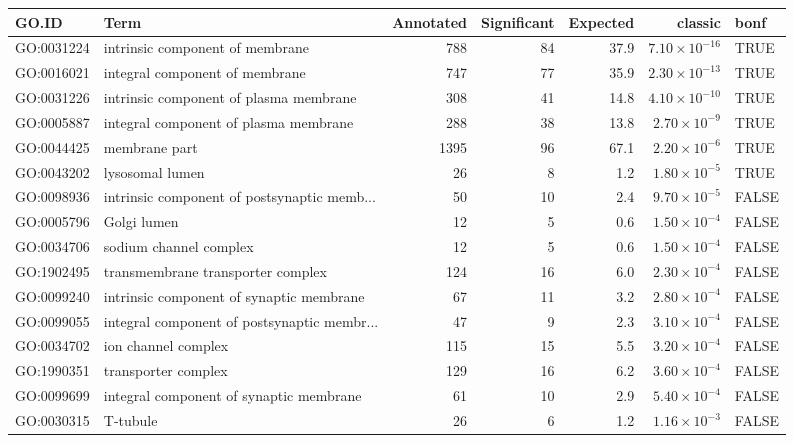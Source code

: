 \begin{table}[ht]
\centering
\begin{adjustbox}{max width=\textwidth}
\begin{tabular}{llrrrrl}
  \hline
GO.ID & Term & Annotated & Significant & Expected & classic & bonf \\ 
  \hline
GO:0031224 & intrinsic component of membrane & 788 & 84 & 37.9 & $7.10 \times 10^{-16}$ & TRUE \\ 
  GO:0016021 & integral component of membrane & 747 & 77 & 35.9 & $2.30 \times 10^{-13}$ & TRUE \\ 
  GO:0031226 & intrinsic component of plasma membrane & 308 & 41 & 14.8 & $4.10 \times 10^{-10}$ & TRUE \\ 
  GO:0005887 & integral component of plasma membrane & 288 & 38 & 13.8 & $2.70 \times 10^{-9}$ & TRUE \\ 
  GO:0044425 & membrane part & 1395 & 96 & 67.1 & $2.20 \times 10^{-6}$ & TRUE \\ 
  GO:0043202 & lysosomal lumen & 26 & 8 & 1.2 & $1.80 \times 10^{-5}$ & TRUE \\ 
  GO:0098936 & intrinsic component of postsynaptic memb... & 50 & 10 & 2.4 & $9.70 \times 10^{-5}$ & FALSE \\ 
  GO:0005796 & Golgi lumen & 12 & 5 & 0.6 & $1.50 \times 10^{-4}$ & FALSE \\ 
  GO:0034706 & sodium channel complex & 12 & 5 & 0.6 & $1.50 \times 10^{-4}$ & FALSE \\ 
  GO:1902495 & transmembrane transporter complex & 124 & 16 & 6.0 & $2.30 \times 10^{-4}$ & FALSE \\ 
  GO:0099240 & intrinsic component of synaptic membrane & 67 & 11 & 3.2 & $2.80 \times 10^{-4}$ & FALSE \\ 
  GO:0099055 & integral component of postsynaptic membr... & 47 & 9 & 2.3 & $3.10 \times 10^{-4}$ & FALSE \\ 
  GO:0034702 & ion channel complex & 115 & 15 & 5.5 & $3.20 \times 10^{-4}$ & FALSE \\ 
  GO:1990351 & transporter complex & 129 & 16 & 6.2 & $3.60 \times 10^{-4}$ & FALSE \\ 
  GO:0099699 & integral component of synaptic membrane & 61 & 10 & 2.9 & $5.40 \times 10^{-4}$ & FALSE \\ 
  GO:0030315 & T-tubule & 26 & 6 & 1.2 & $1.16 \times 10^{-3}$ & FALSE \\ 

\end{tabular}
\end{adjustbox}
\end{table}
